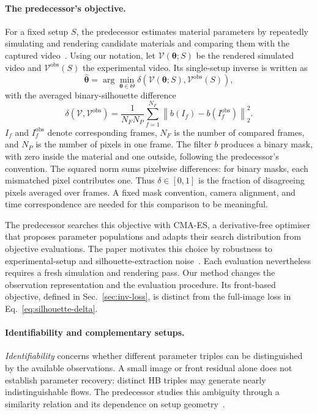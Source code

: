 \paragraph{The predecessor's objective.}
For a fixed setup $S$, the predecessor estimates material parameters
by repeatedly simulating and rendering candidate materials and comparing
them with the captured video~\cite{hamamichi2023nonnewtonian}.
Using our notation, let $\mathcal V(\boldsymbol\theta;S)$ be the
rendered simulated video and $\mathcal V^{\mathrm{obs}}(S)$ the
experimental video. Its single-setup inverse is written as
\begin{equation}
\label{eq:inverse-generic}
    \hat{\boldsymbol\theta}
    =\arg\min_{\boldsymbol\theta\in\Theta}
    \delta\!\left(\mathcal V(\boldsymbol\theta;S),
                   \mathcal V^{\mathrm{obs}}(S)\right),
\end{equation}
with the averaged binary-silhouette difference
\cite[Eq.~3]{hamamichi2023nonnewtonian}
\begin{equation}
\label{eq:silhouette-delta}
    \delta(\mathcal V,\mathcal V^{\mathrm{obs}})
    =\frac{1}{N_FN_P}\sum_{f=1}^{N_F}
      \left\|b(I_f)-b(I_f^{\mathrm{obs}})\right\|_2^2.
\end{equation}
$I_f$ and $I_f^{\mathrm{obs}}$ denote corresponding frames,
$N_F$ is the number of compared frames, and $N_P$ is the number
of pixels in one frame. The filter $b$ produces a binary mask,
with zero inside the material and one outside, following the
predecessor's convention. The squared norm sums pixelwise differences:
for binary masks, each mismatched pixel contributes one. Thus
$\delta\in[0,1]$ is the fraction of disagreeing pixels averaged
over frames. A fixed mask convention, camera alignment, and time
correspondence are needed for this comparison to be meaningful.

The predecessor searches this objective with CMA-ES, a derivative-free
optimiser that proposes parameter populations and adapts their search
distribution from objective evaluations. The paper motivates this
choice by robustness to experimental-setup and silhouette-extraction
noise~\cite[Sec.~3.1]{hamamichi2023nonnewtonian}. Each evaluation
nevertheless requires a fresh simulation and rendering pass.
Our method changes the observation representation and the evaluation
procedure. Its front-based objective, defined in
Sec.~\ref{sec:inv-loss}, is distinct from the full-image loss in
Eq.~\eqref{eq:silhouette-delta}.

\paragraph{Identifiability and complementary setups.}
\emph{Identifiability} concerns whether different parameter triples
can be distinguished by the available observations. A small image or
front residual alone does not establish parameter recovery: distinct
HB triples may generate nearly indistinguishable flows. The predecessor
studies this ambiguity through a similarity relation and its dependence
on setup geometry~\cite{hamamichi2023nonnewtonian}.

